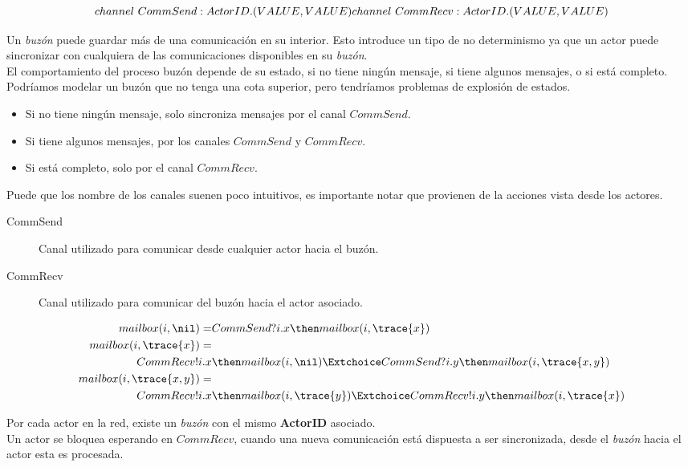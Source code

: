 \[
channel\ CommSend:ActorID.(VALUE, VALUE)\\
channel\ CommRecv:ActorID.(VALUE, VALUE)
\]

Un \textit{buzón} puede guardar más de una comunicación en su interior. Esto introduce un tipo de no determinismo ya que un actor puede sincronizar con cualquiera de las comunicaciones disponibles en su \textit{buzón}.\\
El comportamiento del proceso buzón depende de su estado, si no tiene ningún mensaje, si tiene algunos mensajes, o si está completo. Podríamos modelar un buzón que no tenga una cota superior, pero tendríamos problemas de explosión de estados.

\begin{itemize}
\item Si no tiene ningún mensaje, solo sincroniza mensajes por el canal $CommSend$.
\item Si tiene algunos mensajes, por los canales $CommSend$ y $CommRecv$.
\item Si está completo, solo por el canal $CommRecv$.
\end{itemize}

Puede que los nombre de los canales suenen poco intuitivos, es importante notar que provienen de la acciones vista desde los actores.

\begin{description}
\item [CommSend] Canal utilizado para comunicar desde cualquier actor hacia el buzón.
\item [CommRecv] Canal utilizado para comunicar del buzón hacia el actor asociado.
\end{description}

\begin{align*}
mailbox(i, \nil) =& CommSend?i.x \then mailbox(i, \trace{x}) \\
mailbox(i, \trace{x}) =& \\
CommRecv!i.x & \then mailbox(i, \nil) \Extchoice CommSend?i.y \then mailbox(i, \trace{x, y}) \\
mailbox(i, \trace{x, y}) =& \\
CommRecv!i.x & \then mailbox(i,\trace{y}) \Extchoice CommRecv!i.y \then mailbox(i, \trace{x}) 
\end{align*}

Por cada actor en la red, existe un \textit{buzón} con el mismo \textbf{ActorID}
asociado. \\ 
Un actor se bloquea esperando en $CommRecv$, cuando una nueva comunicación está
dispuesta a ser sincronizada, desde el \textit{buzón} hacia el actor esta es procesada.

